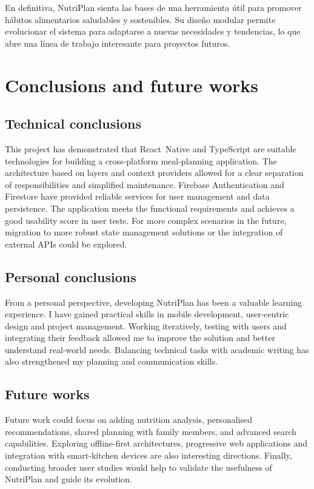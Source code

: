 \documentclass[twoside, openright, 11pt]{report}
\begin{document}
En definitiva, NutriPlan sienta las bases de una herramienta útil para promover hábitos alimentarios saludables y sostenibles. Su diseño modular permite evolucionar el sistema para adaptarse a nuevas necesidades y tendencias, lo que abre una línea de trabajo interesante para proyectos futuros.

\chapter{Conclusions and future works}
\label{cap.englishconclusions}

\section{Technical conclusions}
This project has demonstrated that React Native and TypeScript are suitable technologies for building a cross‑platform meal‑planning application. The architecture based on layers and context providers allowed for a clear separation of responsibilities and simplified maintenance. Firebase Authentication and Firestore have provided reliable services for user management and data persistence. The application meets the functional requirements and achieves a good usability score in user tests. For more complex scenarios in the future, migration to more robust state management solutions or the integration of external APIs could be explored.

\section{Personal conclusions}
From a personal perspective, developing NutriPlan has been a valuable learning experience. I have gained practical skills in mobile development, user‑centric design and project management. Working iteratively, testing with users and integrating their feedback allowed me to improve the solution and better understand real‑world needs. Balancing technical tasks with academic writing has also strengthened my planning and communication skills.

\section{Future works}
Future work could focus on adding nutrition analysis, personalised recommendations, shared planning with family members, and advanced search capabilities. Exploring offline‑first architectures, progressive web applications and integration with smart‑kitchen devices are also interesting directions. Finally, conducting broader user studies would help to validate the usefulness of NutriPlan and guide its evolution.

\cleardoublepage
{}


\end{document}
